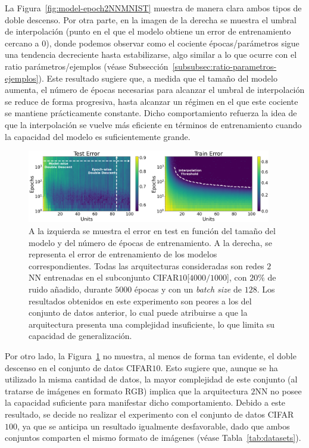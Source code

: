La Figura~\ref{fig:model-epoch2NNMNIST} muestra de manera clara ambos tipos de doble descenso. Por otra parte, en la imagen de la derecha se muestra el umbral de interpolación (punto en el que el modelo obtiene un error de entrenamiento cercano a $0$), donde podemos observar como el cociente épocas/parámetros sigue una tendencia decreciente hasta estabilizarse, algo similar a lo que ocurre con el ratio parámetros/ejemplos (véase Subsección~\ref{subsubsec:ratio-parametros-ejemplos}). Este resultado sugiere que, a medida que el tamaño del modelo aumenta, el número de épocas necesarias para alcanzar el umbral de interpolación se reduce de forma progresiva, hasta alcanzar un régimen en el que este cociente se mantiene prácticamente constante. Dicho comportamiento refuerza la idea de que la interpolación se vuelve más eficiente en términos de entrenamiento cuando la capacidad del modelo es suficientemente grande.

\begin{figure}[h]
    \centering
    \includegraphics[width=0.95\textwidth]{img/experiments/model-epoch2NNCIFAR10.png}
    \caption[Error en entrenamiento y test en función del tamaño del modelo y del número de épocas para la red $2$NN y un subconjunto de CIFAR$10$.]{A la izquierda se muestra el error en test en función del tamaño del modelo y del número de épocas de entrenamiento. A la derecha, se representa el error de entrenamiento de los modelos correspondientes. Todas las arquitecturas consideradas son redes $2$NN entrenadas en el subconjunto CIFAR$10$[$4000/1000$], con $20\%$ de ruido añadido, durante $5000$ épocas y con un \textit{batch size} de $128$. Los resultados obtenidos en este experimento son peores a los del conjunto de datos anterior, lo cual puede atribuirse a que la arquitectura presenta una complejidad insuficiente, lo que limita su capacidad de generalización.}\label{fig:model-epoch2NNCIFAR10}
\end{figure}

Por otro lado, la Figura~\ref{fig:model-epoch2NNCIFAR10} no muestra, al menos de forma tan evidente, el doble descenso en el conjunto de datos CIFAR$10$. Esto sugiere que, aunque se ha utilizado la misma cantidad de datos, la mayor complejidad de este conjunto (al tratarse de imágenes en formato RGB) implica que la arquitectura $2$NN no posee la capacidad suficiente para manifestar dicho comportamiento. Debido a este resultado, se decide no realizar el experimento con el conjunto de datos CIFAR$100$, ya que se anticipa un resultado igualmente desfavorable, dado que ambos conjuntos comparten el mismo formato de imágenes (véase Tabla~\ref{tab:datasets}).

